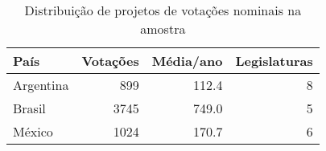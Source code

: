 \begin{table}[!h]

\caption{\label{tab:votacoes}Distribuição de projetos de votações nominais na amostra}
\centering
\begin{tabular}[t]{lrrr}
\toprule
País & Votações & Média/ano & Legislaturas\\
\midrule
Argentina & 899 & 112.4 & 8\\
Brasil & 3745 & 749.0 & 5\\
México & 1024 & 170.7 & 6\\
\bottomrule
\end{tabular}
\end{table}
